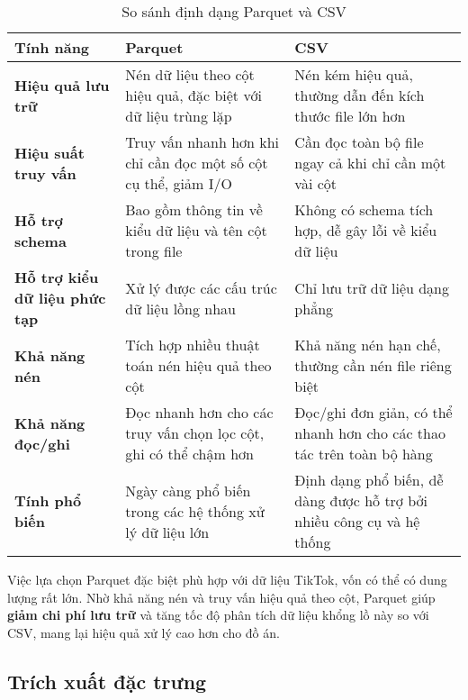 \begin{table}[H]
    \centering
    \caption{So sánh định dạng Parquet và CSV}

    \renewcommand{\arraystretch}{1.4}

    \begin{tabular}{|p{3.8cm}|p{6cm}|p{6cm}|}
        \hline
        \textbf{Tính năng} & \textbf{Parquet} & \textbf{CSV} \\
        \hline
        \textbf{Hiệu quả lưu trữ} & Nén dữ liệu theo cột hiệu quả, đặc biệt với dữ liệu trùng lặp & Nén kém hiệu quả, thường dẫn đến kích thước file lớn hơn \\
        \hline
        \textbf{Hiệu suất truy vấn} & Truy vấn nhanh hơn khi chỉ cần đọc một số cột cụ thể, giảm I/O & Cần đọc toàn bộ file ngay cả khi chỉ cần một vài cột \\
        \hline
        \textbf{Hỗ trợ schema} & Bao gồm thông tin về kiểu dữ liệu và tên cột trong file & Không có schema tích hợp, dễ gây lỗi về kiểu dữ liệu \\
        \hline
        \textbf{Hỗ trợ kiểu dữ liệu phức tạp} & Xử lý được các cấu trúc dữ liệu lồng nhau & Chỉ lưu trữ dữ liệu dạng phẳng \\
        \hline
        \textbf{Khả năng nén} & Tích hợp nhiều thuật toán nén hiệu quả theo cột & Khả năng nén hạn chế, thường cần nén file riêng biệt \\
        \hline
        \textbf{Khả năng đọc/ghi} & Đọc nhanh hơn cho các truy vấn chọn lọc cột, ghi có thể chậm hơn & Đọc/ghi đơn giản, có thể nhanh hơn cho các thao tác trên toàn bộ hàng \\
        \hline
        \textbf{Tính phổ biến} & Ngày càng phổ biến trong các hệ thống xử lý dữ liệu lớn & Định dạng phổ biến, dễ dàng được hỗ trợ bởi nhiều công cụ và hệ thống \\
        \hline
    \end{tabular}
    \label{tab:parquet_csv}
\end{table}

Việc lựa chọn Parquet đặc biệt phù hợp với dữ liệu TikTok, vốn có thể có dung lượng rất lớn. Nhờ khả năng nén và truy vấn hiệu quả theo cột, Parquet giúp \textbf{giảm chi phí lưu trữ} và tăng tốc độ phân tích dữ liệu khổng lồ này so với CSV, mang lại hiệu quả xử lý cao hơn cho đồ án.

\subsection{Trích xuất đặc trưng}

